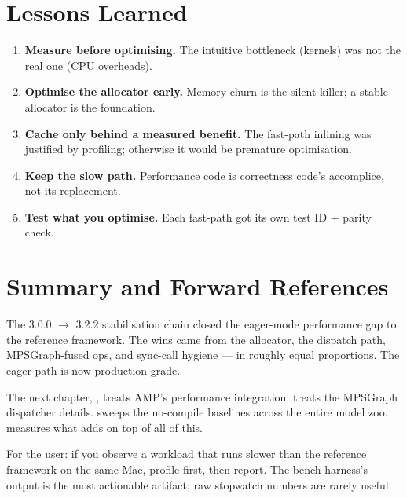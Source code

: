 \section{Lessons Learned}
\label{sec:stabilization:lessons}

\begin{enumerate}
  \item \textbf{Measure before optimising.} The intuitive
    bottleneck (kernels) was not the real one (CPU overheads).
  \item \textbf{Optimise the allocator early.} Memory churn is
    the silent killer; a stable allocator is the foundation.
  \item \textbf{Cache only behind a measured benefit.} The
    fast-path inlining was justified by profiling; otherwise
    it would be premature optimisation.
  \item \textbf{Keep the slow path.} Performance code is
    correctness code's accomplice, not its replacement.
  \item \textbf{Test what you optimise.} Each fast-path got
    its own test ID + parity check.
\end{enumerate}

\section{Summary and Forward References}
\label{sec:stabilization:summary}

The 3.0.0 $\to$ 3.2.2 stabilisation chain closed the eager-mode
performance gap to the reference framework. The wins came from
the allocator, the dispatch path, MPSGraph-fused ops, and
sync-call hygiene --- in roughly equal proportions. The eager
path is now production-grade.

The next chapter, , treats AMP's
performance integration.  treats
the MPSGraph dispatcher details. 
sweeps the no-compile baselines across the entire model zoo.
 measures what
 adds on top of all of this.

\begin{lucidnote}
For the user: if you observe a workload that runs slower than
the reference framework on the same Mac, profile first, then
report. The bench harness's output is the most actionable
artifact; raw stopwatch numbers are rarely useful.
\end{lucidnote}
